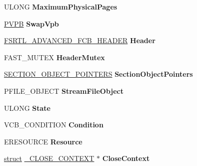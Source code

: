 \begin{DoxyCompactItemize}
U\+L\+O\+NG {\bfseries Maximum\+Physical\+Pages}
\item 
\mbox{\label{struct___v_c_b_a34150d636db7cf768830823a406cd98b}} 
\hyperlink{struct___v_p_b}{P\+V\+PB} {\bfseries Swap\+Vpb}
\item 
\mbox{\label{struct___v_c_b_ab743afbe15aff3ab8afd43f9f416ee72}} 
\hyperlink{struct___f_s_r_t_l___a_d_v_a_n_c_e_d___f_c_b___h_e_a_d_e_r}{F\+S\+R\+T\+L\+\_\+\+A\+D\+V\+A\+N\+C\+E\+D\+\_\+\+F\+C\+B\+\_\+\+H\+E\+A\+D\+ER} {\bfseries Header}
\item 
\mbox{\label{struct___v_c_b_a822ac650ea59becbd8070c50c77db80e}} 
F\+A\+S\+T\+\_\+\+M\+U\+T\+EX {\bfseries Header\+Mutex}
\item 
\mbox{\label{struct___v_c_b_abfe47b8827dec814e3079a63d67d2d66}} 
\hyperlink{struct___s_e_c_t_i_o_n___o_b_j_e_c_t___p_o_i_n_t_e_r_s}{S\+E\+C\+T\+I\+O\+N\+\_\+\+O\+B\+J\+E\+C\+T\+\_\+\+P\+O\+I\+N\+T\+E\+RS} {\bfseries Section\+Object\+Pointers}
\item 
\mbox{\label{struct___v_c_b_a2bd012dd8c45218b01fe126a5269052d}} 
P\+F\+I\+L\+E\+\_\+\+O\+B\+J\+E\+CT {\bfseries Stream\+File\+Object}
\item 
\mbox{\label{struct___v_c_b_ab58f106eadd4454e35d174e7e2667a2c}} 
U\+L\+O\+NG {\bfseries State}
\item 
\mbox{\label{struct___v_c_b_a618393975eec5e3d3c39c16a7559091e}} 
V\+C\+B\+\_\+\+C\+O\+N\+D\+I\+T\+I\+ON {\bfseries Condition}
\item 
\mbox{\label{struct___v_c_b_a3ede2d6ec22e95abe290fe83648c8633}} 
E\+R\+E\+S\+O\+U\+R\+CE {\bfseries Resource}
\item 
\mbox{\label{struct___v_c_b_a6ac978344c29d5448324fb87ca2bd961}} 
\hyperlink{interfacestruct}{struct} \hyperlink{struct___c_l_o_s_e___c_o_n_t_e_x_t}{\+\_\+\+C\+L\+O\+S\+E\+\_\+\+C\+O\+N\+T\+E\+XT} $\ast$ {\bfseries Close\+Context}
\item 
\mbox{\label{struct___v_c_b_a09c9f3b061a051087c04303d7c6532e3}} 

\end{DoxyCompactItemize}
